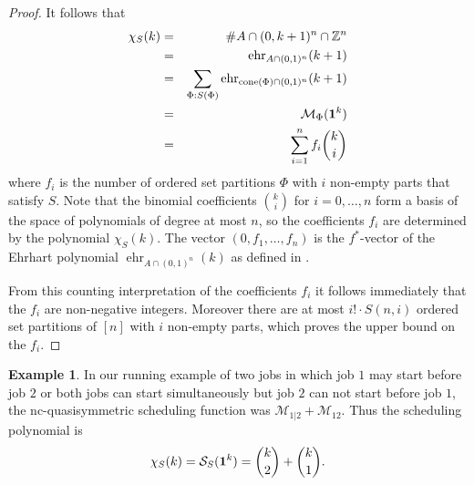 \documentclass[12pt,reqno]{amsart}
\numberwithin{definition}{section}
\theoremstyle{definition}
\newtheorem{example}[definition]{Example}
\newcommand{\ZZ}{\mathbb{Z}}
\newcommand{\SSS}{\mathcal{S}}
\newcommand{\ehr}{\operatorname{ehr}}
\newcommand{\cone}{\operatorname{cone}}
\newcommand{\ncM}{\mathcal{M}}
\newcommand{\poly}{\chi} %
\begin{document}
\begin{proof}
It follows that
\begin{eqnarray*}
  \poly_S(k) &=& \#A\cap(0,k+1)^n\cap\ZZ^n \\
  &=& \ehr_{A\cap(0,1)^n}(k+1) \\
  &=& \sum_{\Phi:S(\Phi)} \ehr_{\cone(\Phi)\cap(0,1)^n}(k+1) \\
  &=& \ncM_{\Phi}({\bf 1}^k) \\  
&=& \sum_{i=1}^n f_i\binom{k}{i}
\end{eqnarray*}
where $f_i$ is the number of ordered set partitions $\Phi$ with $i$ non-empty parts that satisfy $S$. Note that the binomial coefficients $\binom{k}{i}$ for $i=0,\ldots,n$ form a basis of the space of polynomials of degree at most $n$, so the coefficients $f_i$ are determined by the polynomial $\poly_S(k)$. The vector $(0,f_1,\ldots,f_n)$ is the $f^*$-vector of the Ehrhart polynomial $\ehr_{A\cap(0,1)^n}(k)$ as defined in \cite{fstar}.

From this counting interpretation of the coefficients $f_i$ it follows immediately that the $f_i$ are non-negative integers. Moreover there are at most $i!\cdot S(n,i)$ ordered set partitions of $[n]$ with $i$ non-empty parts, which proves the upper bound on the $f_i$. 

\end{proof}


\begin{example}
In our running example of two jobs in which job $1$ may start before job $2$ or both jobs can start simultaneously but job $2$ can not start before job $1$, the nc-quasisymmetric scheduling function was $\ncM_{1|2} + \ncM_{12}$.  Thus the scheduling polynomial is
$$\poly_S(k) = \SSS_S({\bf 1}^k) = \binom{k}{2} + \binom{k}{1}.$$
\end{example}
\end{document}
